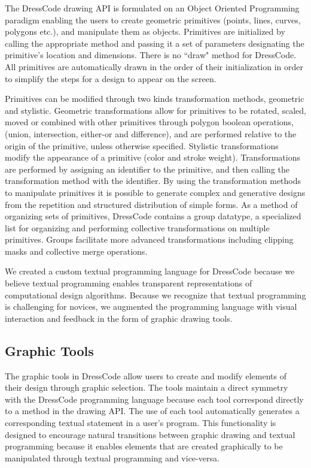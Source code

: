 \documentclass{sigchi}
\begin{document}
The DressCode drawing API is formulated on an Object Oriented Programming paradigm enabling the users to create geometric primitives (points, lines, curves, polygons etc.), and manipulate them as objects. Primitives are initialized by calling the appropriate method and passing it a set of parameters designating the primitive's location and dimensions. There is no ``draw" method for DressCode. All primitives are automatically drawn in the order of their initialization in order to simplify the steps for a design to appear on the screen.
 
Primitives can be modified through two kinds transformation methods, geometric and stylistic. Geometric transformations allow for primitives to be rotated, scaled, moved or combined with other primitives through polygon boolean operations, (union, intersection, either-or and difference), and are performed relative to the origin of the primitive, unless otherwise specified. Stylistic transformations modify the appearance of a primitive (color and stroke weight). Transformations are performed by assigning an identifier to the primitive, and then calling the transformation method with the identifier. By using the transformation methods to manipulate primitives it is possible to generate complex and generative designs from the repetition and structured distribution of simple forms. As a method of organizing sets of primitives, DressCode contains a group datatype, a specialized list for organizing and performing collective transformations on multiple primitives. Groups facilitate more advanced transformations including clipping masks and collective merge operations. 

We created a custom textual programming language for DressCode because we believe textual programming enables transparent representations of computational design algorithms. Because we recognize that textual programming is challenging for novices, we augmented the programming language with visual interaction and feedback in the form of graphic drawing tools.
 
\subsection{Graphic Tools}
\label{subsec:graphic_tools_test}
The graphic tools in DressCode allow users to create and modify elements of their design through graphic selection. The tools maintain a direct symmetry with the DressCode programming language because each tool correspond directly to a method in the drawing API. The use of each tool automatically generates a corresponding textual statement in a user's program. This functionality is designed to encourage natural transitions between graphic drawing and textual programming because it enables elements that are created graphically to be manipulated through textual programming and vice-versa.
\end{document}
